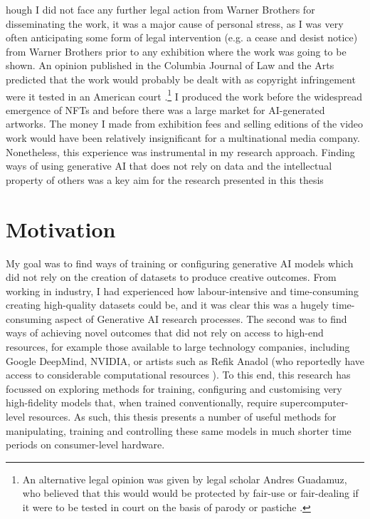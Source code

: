 hough I did not face any further legal action from Warner Brothers for  disseminating the work, it was a major cause of personal stress, as I was very often anticipating some form of legal intervention (e.g. a cease and desist notice) from Warner Brothers prior to any exhibition where the work was going to be shown.
An opinion published in the Columbia Journal of Law and the Arts predicted that the work would probably be dealt with as copyright infringement were it tested in an American court \citep{sobel2017artificial}.\footnote{An alternative legal opinion was given by legal scholar Andres Guadamuz, who believed that this would would be protected by fair-use or fair-dealing if it were to be tested in court on the basis of parody or pastiche \citep{guadamuz2024personal}.} 
I produced the work before the widespread emergence of NFTs and before there was a large market for AI-generated artworks. 
The money I made from exhibition fees and selling editions of the video work would have been relatively insignificant for a multinational media company. 
Nonetheless, this experience was instrumental in my research approach. 
Finding ways of using generative AI that does not rely on data and the intellectual property of others was a key aim for the research presented in this thesis

\section{Motivation}

My goal was to find ways of training or configuring generative AI models which did not rely on the creation of datasets to produce creative outcomes. 
From working in industry, I had experienced how labour-intensive and time-consuming creating high-quality datasets could be, and it was clear this was a hugely time-consuming aspect of Generative AI research processes.
The second was to find ways of achieving novel outcomes that did not rely on access to high-end resources, for example those available to large technology companies, including Google DeepMind, NVIDIA, or artists such as Refik Anadol (who reportedly have access to considerable computational resources  \citep{caulfield2022refik}). 
To this end, this research has focussed on exploring methods for training, configuring and customising very high-fidelity models that, when trained conventionally, require supercomputer-level resources. 
As such, this thesis presents a number of useful methods for manipulating, training and controlling these same models in much shorter time periods on consumer-level hardware.


